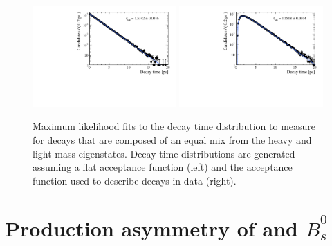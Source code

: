 \begin{figure}[htbp]
  \centering
    \includegraphics[width=0.49\textwidth]{./Figs/LifetimeSystematics/No_acc_fit.pdf}
    \includegraphics[width=0.49\textwidth]{./Figs/LifetimeSystematics/Acc_fit.pdf}
  \caption{Maximum likelihood fits to the decay time distribution to measure \tmumu for \bsmumu decays that are composed of an equal mix from the heavy and light mass eigenstates. Decay time distributions are generated assuming a flat acceptance function (left) and the acceptance function used to describe \bsmumu decays in data (right).}
  \label{fig:mixofstates}
\end{figure}


\section{Production asymmetry of \bs and $\overline{B}_{s}^{0}$}
\label{sec:productionasymetry}



